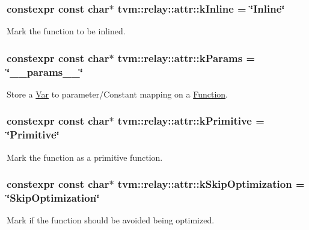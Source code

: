 \subsubsection[{\texorpdfstring{k\+Inline}{kInline}}]{\setlength{\rightskip}{0pt plus 5cm}constexpr const char$\ast$ tvm\+::relay\+::attr\+::k\+Inline = \char`\"{}Inline\char`\"{}}\hypertarget{namespacetvm_1_1relay_1_1attr_ad294262b6b1ca1b7bf3924a139f17562}{}\label{namespacetvm_1_1relay_1_1attr_ad294262b6b1ca1b7bf3924a139f17562}


Mark the function to be inlined. 

\subsubsection[{\texorpdfstring{k\+Params}{kParams}}]{\setlength{\rightskip}{0pt plus 5cm}constexpr const char$\ast$ tvm\+::relay\+::attr\+::k\+Params = \char`\"{}\+\_\+\+\_\+params\+\_\+\+\_\+\char`\"{}}\hypertarget{namespacetvm_1_1relay_1_1attr_a3cd72e0efb5bcba623c8af8cf0f5314d}{}\label{namespacetvm_1_1relay_1_1attr_a3cd72e0efb5bcba623c8af8cf0f5314d}


Store a \hyperlink{classtvm_1_1relay_1_1Var}{Var} to parameter/\+Constant mapping on a \hyperlink{classtvm_1_1relay_1_1Function}{Function}. 

\subsubsection[{\texorpdfstring{k\+Primitive}{kPrimitive}}]{\setlength{\rightskip}{0pt plus 5cm}constexpr const char$\ast$ tvm\+::relay\+::attr\+::k\+Primitive = \char`\"{}Primitive\char`\"{}}\hypertarget{namespacetvm_1_1relay_1_1attr_ac3c86a7b4b9e64aed0da4b8294278484}{}\label{namespacetvm_1_1relay_1_1attr_ac3c86a7b4b9e64aed0da4b8294278484}


Mark the function as a primitive function. 

\subsubsection[{\texorpdfstring{k\+Skip\+Optimization}{kSkipOptimization}}]{\setlength{\rightskip}{0pt plus 5cm}constexpr const char$\ast$ tvm\+::relay\+::attr\+::k\+Skip\+Optimization = \char`\"{}Skip\+Optimization\char`\"{}}\hypertarget{namespacetvm_1_1relay_1_1attr_aed3671df7e12d228b8070806d07f7c62}{}\label{namespacetvm_1_1relay_1_1attr_aed3671df7e12d228b8070806d07f7c62}


Mark if the function should be avoided being optimized. 

